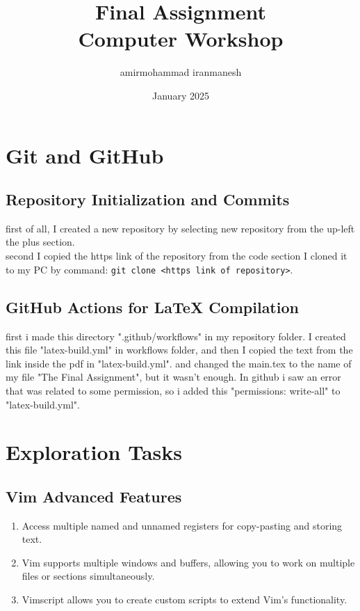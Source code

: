 \documentclass{article}
\title{Final Assignment\\[0.2cm]Computer Workshop}
\author{amirmohammad iranmanesh}
\date{January 2025}
\begin{document}
\maketitle

\newpage
\tableofcontents

\newpage

\section{Git and GitHub}
    \subsection{Repository Initialization and Commits}
    first of all, I created a new repository by selecting new repository from the up-left the plus section.
    \\ second I copied the https link of the repository from the code section I cloned it to my PC by command: \texttt{git clone \textless https link of repository\textgreater}.
    \subsection{GitHub Actions for LaTeX Compilation}
     first i made this directory ".github/workflows" in my repository folder. I created this file "latex-build.yml" in workflows folder, and then I copied the text from the link inside the pdf in "latex-build.yml". and changed the main.tex to the name of my file "The Final Assignment", but it wasn't enough. In github i saw an error that was related to some permission, so i added this "permissions: write-all" to  "latex-build.yml".

\section{Exploration Tasks}
    \subsection{Vim Advanced Features}
    \begin{enumerate}
        \item Access multiple named and unnamed registers for copy-pasting and storing text.
        \item Vim supports multiple windows and buffers, allowing you to work on multiple files or sections simultaneously.
        \item Vimscript allows you to create custom scripts to extend Vim's functionality.
    \end{enumerate}
\end{document}
